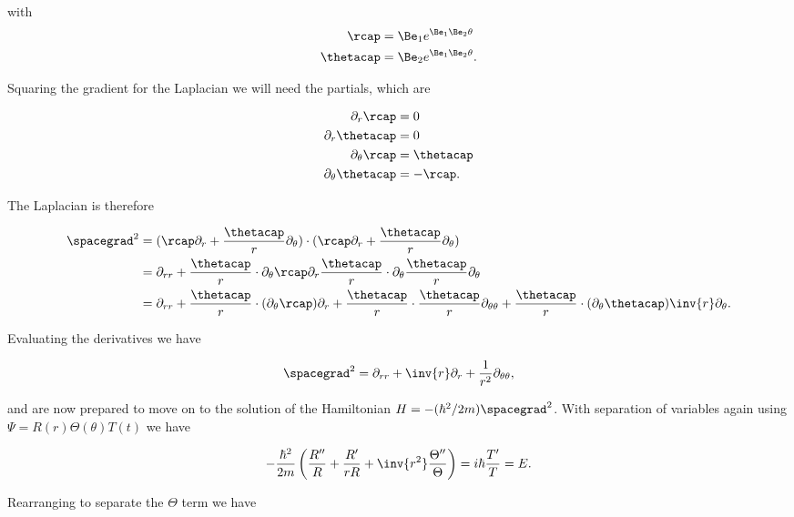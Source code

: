 with
\begin{align}\label{eqn:desaiCh4:141}
\rcap &= \Be_1 e^{\Be_1 \Be_2 \theta} \\
\thetacap &= \Be_2 e^{\Be_1 \Be_2 \theta} .
\end{align}

Squaring the gradient for the Laplacian we will need the partials, which are

\begin{align*}
\partial_r \rcap &= 0 \\
\partial_r \thetacap &= 0 \\
\partial_\theta \rcap &= \thetacap \\
\partial_\theta \thetacap &= -\rcap.
\end{align*}

The Laplacian is therefore

\begin{align*}
\spacegrad^2 
&= 
(\rcap \partial_r + \frac{\thetacap}{r} \partial_\theta) \cdot
(\rcap \partial_r + \frac{\thetacap}{r} \partial_\theta) \\
&= 
\partial_{rr} + 
\frac{\thetacap}{r} \cdot \partial_\theta \rcap \partial_r 
\frac{\thetacap}{r} \cdot \partial_\theta \frac{\thetacap}{r} \partial_\theta \\
&= 
\partial_{rr} 
+ \frac{\thetacap}{r} \cdot (\partial_\theta \rcap) \partial_r 
+ \frac{\thetacap}{r} \cdot \frac{\thetacap}{r} \partial_{\theta\theta} 
+ \frac{\thetacap}{r} \cdot (\partial_\theta \thetacap) \inv{r} \partial_\theta .
\end{align*}

Evaluating the derivatives we have

\begin{align}\label{eqn:desaiCh4:150}
\spacegrad^2 = \partial_{rr} + \inv{r} \partial_r + \frac{1}{r^2} \partial_{\theta\theta},
\end{align}

and are now prepared to move on to the solution of the Hamiltonian $H = -(\hbar^2/2m) \spacegrad^2$.  With separation of variables again using $\Psi = R(r) \Theta(\theta) T(t)$ we have

\begin{align}\label{eqn:desaiCh4:151}
-\frac{\hbar^2}{2m} \left( \frac{R''}{R} + \frac{R'}{rR} + \inv{r^2} \frac{\Theta''}{\Theta} \right) = i \hbar \frac{T'}{T} = E.
\end{align}

Rearranging to separate the $\Theta$ term we have

